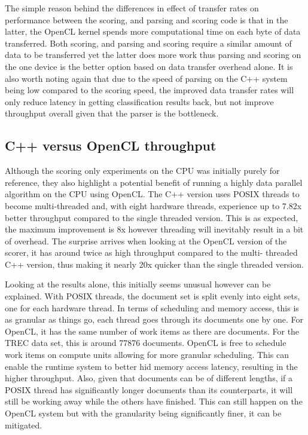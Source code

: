 The simple reason behind the differences in effect of transfer rates on
performance between the scoring, and parsing and scoring code is that in the
latter, the OpenCL kernel spends more computational time on each byte of data
transferred. Both scoring, and parsing and scoring require a similar amount of
data to be transferred yet the latter does more work thus parsing and scoring on
the one device is the better option based on data transfer overhead alone. It is
also worth noting again that due to the speed of parsing on the C++ system being
low compared to the scoring speed, the improved data transfer rates will only
reduce latency in getting classification results back, but not improve
throughput overall given that the parser is the bottleneck.

\subsection{C++ versus OpenCL throughput}

Although the scoring only experiments on the CPU was initially purely for
reference, they also highlight a potential benefit of running a highly data
parallel algorithm on the CPU using OpenCL. The C++ version uses POSIX threads
to become multi-threaded and, with eight hardware threads, experience up to
7.82x better throughput compared to the single threaded version. This is as
expected, the maximum improvement is 8x however threading will inevitably result
in a bit of overhead. The surprise arrives when looking at the OpenCL version of
the scorer, it has around twice as high throughput compared to the multi-
threaded C++ version, thus making it nearly 20x quicker than the single threaded
version.

Looking at the results alone, this initially seems unusual however can be
explained. With POSIX threads, the document set is split evenly into eight sets,
one for each hardware thread. In terms of scheduling and memory access, this is
as granular as things go, each thread goes through its documents one by one. For
OpenCL, it has the same number of work items as there are documents. For the
TREC data set, this is around 77876 documents. OpenCL is free to schedule work
items on compute units allowing for more granular scheduling. This can enable
the runtime system to better hid memory access latency, resulting in the higher
throughput. Also, given that documents can be of different lengths, if a POSIX
thread has significantly longer documents than its counterparts, it will still
be working away while the others have finished. This can still happen on the
OpenCL system but with the granularity being significantly finer, it can be
mitigated.

